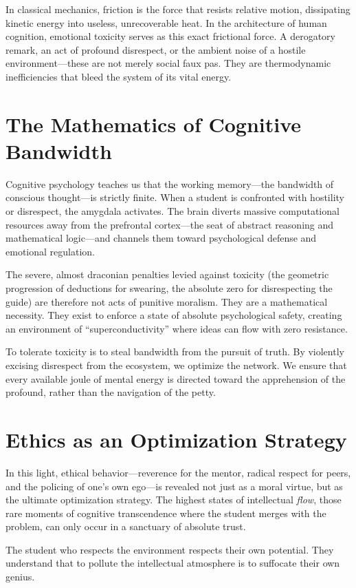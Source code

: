 \documentclass[11pt,a4paper,oneside]{book}
\theoremstyle{definition}
\theoremstyle{remark}
\begin{document}
In classical mechanics, friction is the force that resists relative motion, dissipating kinetic energy into useless, unrecoverable heat. In the architecture of human cognition, emotional toxicity serves as this exact frictional force. A derogatory remark, an act of profound disrespect, or the ambient noise of a hostile environment---these are not merely social faux pas. They are thermodynamic inefficiencies that bleed the system of its vital energy.

\section{The Mathematics of Cognitive Bandwidth}
Cognitive psychology teaches us that the working memory---the bandwidth of conscious thought---is strictly finite. When a student is confronted with hostility or disrespect, the amygdala activates. The brain diverts massive computational resources away from the prefrontal cortex---the seat of abstract reasoning and mathematical logic---and channels them toward psychological defense and emotional regulation.

The severe, almost draconian penalties levied against toxicity (the geometric progression of deductions for swearing, the absolute zero for disrespecting the guide) are therefore not acts of punitive moralism. They are a mathematical necessity. They exist to enforce a state of absolute psychological safety, creating an environment of ``superconductivity'' where ideas can flow with zero resistance. 

To tolerate toxicity is to steal bandwidth from the pursuit of truth. By violently excising disrespect from the ecosystem, we optimize the network. We ensure that every available joule of mental energy is directed toward the apprehension of the profound, rather than the navigation of the petty.

\section{Ethics as an Optimization Strategy}
In this light, ethical behavior---reverence for the mentor, radical respect for peers, and the policing of one's own ego---is revealed not just as a moral virtue, but as the ultimate optimization strategy. The highest states of intellectual \textit{flow}, those rare moments of cognitive transcendence where the student merges with the problem, can only occur in a sanctuary of absolute trust. 

The student who respects the environment respects their own potential. They understand that to pollute the intellectual atmosphere is to suffocate their own genius.
\end{document}
